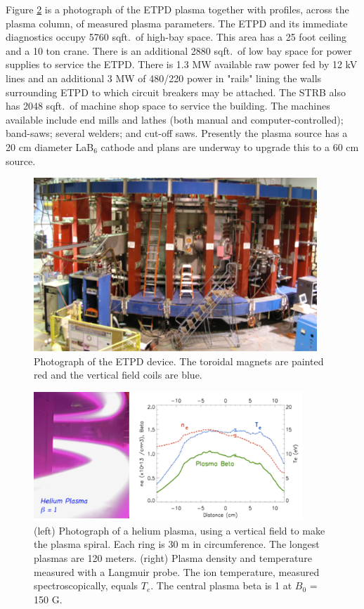 \documentclass[11pt]{article}
\begin{document}
Figure \ref{fig:etpd2} is a photograph of the ETPD plasma together with profiles, across the plasma column, of measured plasma parameters.  The ETPD and its immediate diagnostics occupy 5760 sqft.\ of high-bay space.  This area has a 25 foot ceiling and a 10 ton crane.  There is an additional 2880 sqft.\ of low bay space for power supplies to service the ETPD.  There is 1.3 MW available raw power fed by 12 kV lines and an additional 3 MW of 480/220 power in "rails" lining the walls surrounding ETPD to which circuit breakers may be attached.  The STRB also has 2048 sqft.\ of machine shop space to service the building.  The machines available include end mills and lathes (both manual and computer-controlled); band-saws; several welders; and cut-off saws.  Presently the plasma source has a 20 cm diameter LaB$_{6}$ cathode and plans are underway to upgrade this to a 60 cm source.
\begin{figure}[h] %
   \centering
   \includegraphics[width=0.95\textwidth]{ETPD.jpg} 
   \caption{Photograph of the ETPD device.  The toroidal magnets are painted red and the vertical field coils are blue.}
   \label{fig:etpd}
\end{figure}
\begin{figure}[h] %
   \centering
   \includegraphics[width=0.9\textwidth]{etpd2.jpg} 
   \caption{ (left) Photograph of a helium plasma, using a vertical field to make the plasma spiral.  Each ring is 30 m in circumference.  The longest plasmas are 120 meters. (right) Plasma density and temperature measured with a Langmuir probe.  The ion temperature, measured spectroscopically, equals $T_{e}$. The central plasma beta is 1 at $B_{0}$ = 150 G.  }
   \label{fig:etpd2}
\end{figure}
\end{document}
